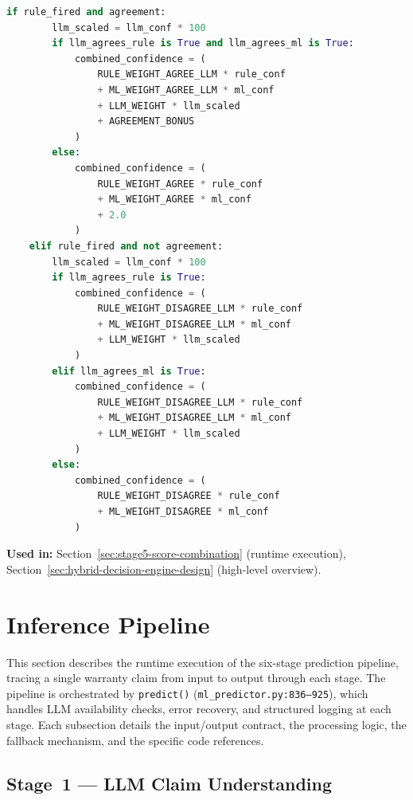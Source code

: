\documentclass[10pt,a4paper]{article}
\begin{document}
\begin{lstlisting}[language=Python]
    if rule_fired and agreement:
        llm_scaled = llm_conf * 100
        if llm_agrees_rule is True and llm_agrees_ml is True:
            combined_confidence = (
                RULE_WEIGHT_AGREE_LLM * rule_conf
                + ML_WEIGHT_AGREE_LLM * ml_conf
                + LLM_WEIGHT * llm_scaled
                + AGREEMENT_BONUS
            )
        else:
            combined_confidence = (
                RULE_WEIGHT_AGREE * rule_conf
                + ML_WEIGHT_AGREE * ml_conf
                + 2.0
            )
    elif rule_fired and not agreement:
        llm_scaled = llm_conf * 100
        if llm_agrees_rule is True:
            combined_confidence = (
                RULE_WEIGHT_DISAGREE_LLM * rule_conf
                + ML_WEIGHT_DISAGREE_LLM * ml_conf
                + LLM_WEIGHT * llm_scaled
            )
        elif llm_agrees_ml is True:
            combined_confidence = (
                RULE_WEIGHT_DISAGREE_LLM * rule_conf
                + ML_WEIGHT_DISAGREE_LLM * ml_conf
                + LLM_WEIGHT * llm_scaled
            )
        else:
            combined_confidence = (
                RULE_WEIGHT_DISAGREE * rule_conf
                + ML_WEIGHT_DISAGREE * ml_conf
            )
\end{lstlisting}

\textbf{Used in:} Section~\ref{sec:stage5-score-combination} (runtime execution), Section~\ref{sec:hybrid-decision-engine-design} (high-level overview).

\section{Inference Pipeline}
\label{sec:inference-pipeline}

This section describes the runtime execution of the six-stage prediction pipeline, tracing a single warranty claim from input to output through each stage. The pipeline is orchestrated by \texttt{predict()} (\texttt{ml\_predictor.py:836--925}), which handles LLM availability checks, error recovery, and structured logging at each stage. Each subsection details the input/output contract, the processing logic, the fallback mechanism, and the specific code references.

\subsection{Stage~1 --- LLM Claim Understanding}
\label{sec:stage1-llm-understanding}
\end{document}
